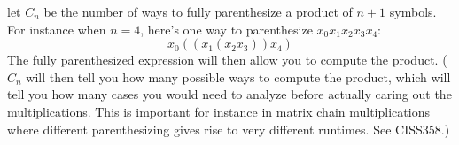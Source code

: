   let $C_n$ be the number of ways to fully parenthesize a product of
  $n + 1$ symbols.
  For instance when $n = 4$,
  here's one way to parenthesize $x_0 x_1 x_2 x_3 x_4$:
  \[
    x_0 ((x_1 (x_2 x_3)) x_4)
  \]
  The fully parenthesized expression will then allow you to compute
  the product.
  ($C_n$ will then tell you how many possible ways to compute the
  product, which will tell you how many cases you would need to analyze
  before actually caring out the multiplications.
  This is important for instance in matrix chain multiplications
  where different parenthesizing gives rise to very different runtimes.
  See CISS358.)
